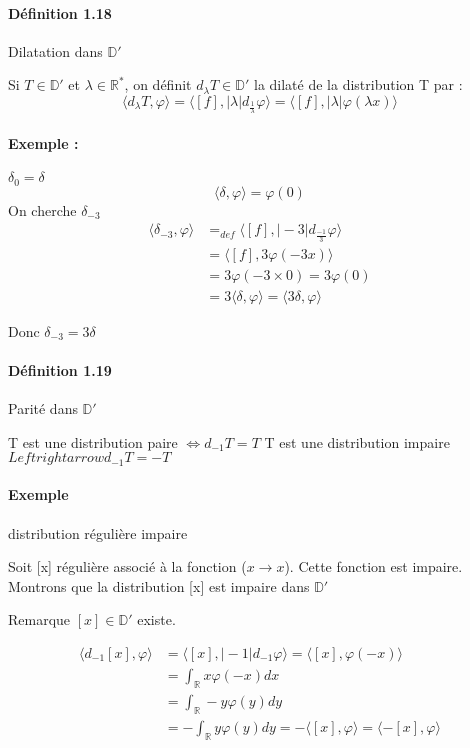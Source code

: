 \documentclass[12pt,a4paper]{report}
\newcommand{\ens}[1]{\mathbb{#1}}
\begin{document}
\paragraph{Définition 1.18} Dilatation dans \(\ens{D'}\)

Si \(T \in \ens{D'}\) et \(\lambda \in \ens{R^*}\), on définit \(d_\lambda T \in \ens{D'}\) la dilaté de la distribution T par :
\[
	\langle d_\lambda T, \varphi \rangle = \langle [f], \vert \lambda \vert d_{\frac{1}{\lambda}} \varphi \rangle = \langle [f], \vert \lambda \vert \varphi (\lambda x) \rangle 
\]

\paragraph{Exemple : } \(\delta_0 = \delta\)
\[
	\langle \delta, \varphi \rangle = \varphi(0)
\]
On cherche \(\delta_{-3}\)
\begin{align*}
	\langle \delta_{-3}, \varphi \rangle &=_{def} \langle [f], \vert -3 \vert d_{\frac{-1}{3}} \varphi \rangle\\
	&= \langle [f], 3 \varphi(-3x) \rangle\\
	&= 3 \varphi (-3 \times 0) = 3 \varphi (0)\\
	&= 3 \langle \delta, \varphi \rangle = \langle 3\delta, \varphi \rangle 
\end{align*}

Donc \(\delta_{-3} = 3\delta\) 

\paragraph{Définition 1.19} Parité dans \(\ens{D'}\)

T est une distribution paire \(\Leftrightarrow d_{-1} T = T\)
T est une distribution impaire \(Leftrightarrow d_{-1} T = -T\)

\paragraph{Exemple} distribution régulière impaire

Soit [x] régulière associé à la fonction (\(x \rightarrow x\)). Cette fonction est impaire. Montrons que la distribution [x] est impaire dans \(\ens{D'}\)

Remarque \([x] \in \ens{D'}\) existe.

\begin{align*}
	\langle d_{-1} [x], \varphi \rangle &= \langle [x],\vert -1 \vert d_{-1} \varphi \rangle = \langle [x], \varphi(-x) \rangle\\
	&= \int_{\ens{R}} x \varphi(-x) dx\\
	&= \int_{\ens{R}} -y \varphi(y) dy\\
	&= - \int_{\ens{R}} y \varphi(y) dy = - \langle [x], \varphi \rangle = \langle -[x], \varphi \rangle\\
\end{align*}
\end{document}
